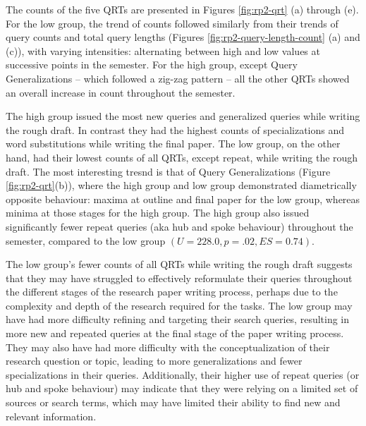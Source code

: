 \documentclass[letterpaper, nobind]{templates/ociamthesis}
\begin{document}
The counts of the five QRTs are presented in Figures \ref{fig:rp2-qrt} (a) through (e).
For the low group, the trend of counts followed similarly from their trends of query counts and total query lengths (Figures \ref{fig:rp2-query-length-count} (a) and (c)), with varying intensities: alternating between high and low values at successive points in the semester.
For the high group, except Query Generalizations -- which followed a zig-zag pattern -- all the other QRTs showed an overall increase in count throughout the semester.

The high group issued the most new queries and generalized queries while writing the rough draft. In contrast they had the highest counts of specializations and word substitutions while writing the final paper.
The low group, on the other hand, had their lowest counts of all QRTs, except repeat, while writing the rough draft.
The most interesting tresnd is that of Query Generalizations (Figure \ref{fig:rp2-qrt}(b)), where the high group and low group demonstrated diametrically opposite behaviour: maxima at outline and final paper for the low group, whereas minima at those stages for the high group.
The high group also issued significantly fewer repeat queries (aka hub and spoke behaviour) throughout the semester, compared to the low group \((U = 228.0, p = .02, ES = 0.74)\).

The low group's fewer counts of all QRTs while writing the rough draft suggests that they may have struggled to effectively reformulate their queries throughout the different stages of the research paper writing process, perhaps due to the complexity and depth of the research required for the tasks.
The low group may have had more difficulty refining and targeting their search queries, resulting in more new and repeated queries at the final stage of the paper writing process.
They may also have had more difficulty with the conceptualization of their research question or topic, leading to more generalizations and fewer specializations in their queries.
Additionally, their higher use of repeat queries (or hub and spoke behaviour) may indicate that they were relying on a limited set of sources or search terms, which may have limited their ability to find new and relevant information.
\end{document}
